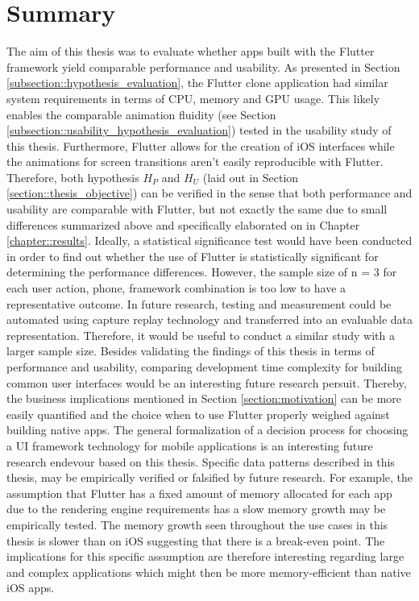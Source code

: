 \chapter{Summary} \label{chapter::summary}
The aim of this thesis was to evaluate whether apps built with the Flutter framework yield comparable performance and usability.
As presented in Section \ref{subsection::hypothesis_evaluation}, the Flutter clone application had similar system requirements in terms of CPU, memory and GPU usage. This likely enables the 
comparable animation fluidity (see Section \ref{subsection::usability_hypothesis_evaluation}) tested in the usability study of this thesis. Furthermore, Flutter allows for the creation of iOS interfaces while the animations for
screen transitions aren't easily reproducible with Flutter. 
Therefore, both hypothesis $H_P$ and $H_U$ (laid out in Section \ref{section::thesis_objective}) can be verified in the sense that both performance and usability are comparable with Flutter, but not exactly the same due to small differences summarized above and specifically elaborated on in Chapter \ref{chapter::results}.
Ideally, a statistical significance test would have been conducted in order to find out whether the
use of Flutter is statistically significant for determining the performance differences. However,
the sample size of n = 3 for each user action, phone, framework combination is too low to have a
representative outcome. In future research, testing and measurement could be automated using
capture replay technology and transferred into an evaluable data representation.
Therefore, it would be useful to conduct a similar study with a larger sample size. 
Besides validating the findings of this thesis in terms of performance and usability, comparing development time complexity for building common user interfaces
would be an interesting future research persuit. Thereby, the business implications mentioned in Section \ref{section:motivation} can be more easily quantified and the choice when to use Flutter 
properly weighed against building native apps.
The general formalization of a decision process for choosing a UI framework technology for mobile applications is an interesting future research endevour based on this thesis.
Specific data patterns described in this thesis, may be empirically verified or falsified by future research.
For example, the assumption that Flutter has a fixed amount of memory allocated for each app due to the rendering engine requirements has a slow memory growth may be empirically tested. 
The memory growth seen throughout the use cases in this thesis is slower than on iOS suggesting that there is a break-even point.
The implications for this specific assumption are therefore interesting regarding large and complex applications which might then be more memory-efficient than native iOS apps.